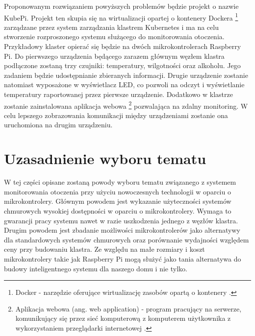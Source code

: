 \documentclass[12pt]{report}
\let\Oldsection\section
\renewcommand{\section}{\FloatBarrier\Oldsection}
\begin{document}
	\indent Proponowanym rozwiązaniem powyższych problemów będzie projekt o nazwie KubePi. Projekt ten skupia się na wirtualizacji opartej o kontenery Dockera
	\footnote{Docker - narzędzie oferujące wirtualizację zasobów opartą o kontenery \cite{docker}.}
zarządzane przez system zarządzania klastrem Kubernetes i ma na celu stworzenie rozproszonego systemu służącego do monitorowania otoczenia. Przykładowy klaster opierać się będzie na dwóch mikrokontrolerach Raspberry Pi. Do pierwszego urządzenia będącego zarazem głównym węzłem klastra podłączone zostaną trzy czujniki: temperatury, wilgotności oraz alkoholu. Jego zadaniem będzie udostęp\-nianie zbieranych informacji. Drugie urządzenie zostanie natomiast wyposażone w wyświetlacz LED, co pozwoli na odczyt i wyświetlanie temperatury raportowanej przez pierwsze urządzenie. Dodatkowo w klastrze zostanie zainstalowana aplikacja webowa
\footnote{Aplikacja webowa (ang. web application) - program pracujący na serwerze, komunikujący się przez sieć komputerową z komputerem użytkownika z wykorzystaniem przeglądarki internetowej \cite{webapp}.}
pozwalająca na zdalny monitoring. W celu lepszego zobrazowania komunikacji między urządzeniami zostanie ona uruchomiona na drugim urządzeniu.

\section{Uzasadnienie wyboru tematu}
W tej części opisane zostaną powody wyboru tematu związanego z systemem monitorowania otoczenia przy użyciu nowoczesnych technologii w oparciu o mikrokontrolery. Głównym powodem jest wykazanie użyteczności systemów chmurowych wysokiej dostępności w oparciu o mikrokontrolery. Wymaga to gwarancji pracy systemu nawet w razie uszkodzenia jednego z węzłów klastra. Drugim powodem jest zbadanie możliwości mikrokontrolerów jako alternatywy dla standardowych systemów chmurowych oraz porównanie wydajności względem ceny przy budowaniu klastra. Ze względu na małe rozmiary i koszt mikrokontrolery takie jak Raspberry Pi mogą służyć jako tania alternatywa do budowy inteligentnego systemu dla naszego domu i nie tylko.
\end{document}
